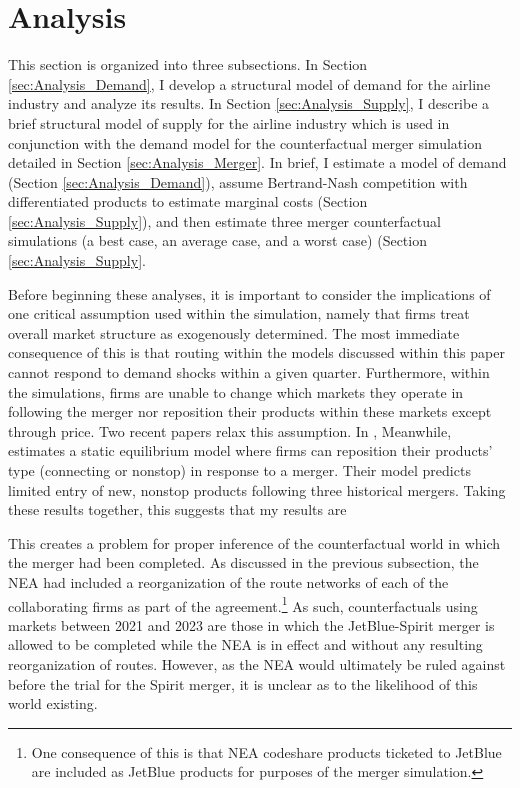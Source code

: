 \documentclass{article}
\begin{document}
	\section{Analysis}
	\label{sec:Analysis}
	
	This section is organized into three subsections. In Section \ref{sec:Analysis_Demand}, I develop a structural model of demand for the airline industry and analyze its results. In Section \ref{sec:Analysis_Supply}, I describe a brief structural model of supply for the airline industry which is used in conjunction with the demand model for the counterfactual merger simulation detailed in Section \ref{sec:Analysis_Merger}. In brief, I estimate a model of demand (Section \ref{sec:Analysis_Demand}), assume Bertrand-Nash competition with differentiated products to estimate marginal costs (Section \ref{sec:Analysis_Supply}), and then estimate three merger counterfactual simulations (a best case, an average case, and a worst case) (Section \ref{sec:Analysis_Supply}. 
	
	Before beginning these analyses, it is important to consider the implications of one critical assumption used within the simulation, namely that firms treat overall market structure as exogenously determined. The most immediate consequence of this is that routing within the models discussed within this paper cannot respond to demand shocks within a given quarter. Furthermore, within the simulations, firms are unable to change which markets they operate in following the merger nor reposition their products within these markets except through price. Two recent papers relax this assumption. In \citet{ciliberto_market_2021}, 
    Meanwhile, \citet{li_repositioning_2022} estimates a static equilibrium model where firms can reposition their products' type (connecting or nonstop) in response to a merger. Their model predicts limited entry of new, nonstop products following three historical mergers. Taking these results together, this suggests that my results are  
	
	This creates a problem for proper inference of the counterfactual world in which the merger had been completed. As discussed in the previous subsection, the NEA had included a reorganization of the route networks of each of the collaborating firms as part of the agreement.\footnote{One consequence of this is that NEA codeshare products ticketed to JetBlue are included as JetBlue products for purposes of the merger simulation.} As such, counterfactuals using markets between 2021 and 2023 are those in which the JetBlue-Spirit merger is allowed to be completed while the NEA is in effect and without any resulting reorganization of routes. However, as the NEA would ultimately be ruled against before the trial for the Spirit merger, it is unclear as to the likelihood of this world existing.
	
\end{document}
